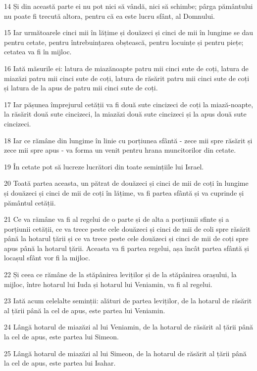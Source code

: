 \par 14 Și din această parte ei nu pot nici să vândă, nici să schimbe; pârga pământului nu poate fi trecută altora, pentru că ea este lucru sfânt, al Domnului.
\par 15 Iar următoarele cinci mii în lățime și douăzeci și cinci de mii în lungime se dau pentru cetate, pentru întrebuințarea obștească, pentru locuințe și pentru piețe; cetatea va fi în mijloc.
\par 16 Iată măsurile ei: latura de miazănoapte patru mii cinci sute de coți, latura de miazăzi patru mii cinci sute de coți, latura de răsărit patru mii cinci sute de coți și latura de la apus de patru mii cinci sute de coți.
\par 17 Iar pășunea împrejurul cetății va fi două sute cincizeci de coți la miază-noapte, la răsărit două sute cincizeci, la miazăzi două sute cincizeci și la apus două sute cincizeci.
\par 18 Iar ce rămâne din lungime în linie cu porțiunea sfântă - zece mii spre răsărit și zece mii spre apus - va forma un venit pentru hrana muncitorilor din cetate.
\par 19 În cetate pot să lucreze lucrători din toate semințiile lui Israel.
\par 20 Toată partea aceasta, un pătrat de douăzeci și cinci de mii de coți în lungime și douăzeci și cinci de mii de coți în lățime, va fi partea sfântă și va cuprinde și pământul cetății.
\par 21 Ce va rămâne va fi al regelui de o parte și de alta a porțiunii sfinte și a porțiunii cetății, ce va trece peste cele douăzeci și cinci de mii de coli spre răsărit până la hotarul țării și ce va trece peste cele douăzeci și cinci de mii de coți spre apus până la hotarul țării. Aceasta va fi partea regelui, așa încât partea sfântă și locașul sfânt vor fi la mijloc.
\par 22 Și ceea ce rămâne de la stăpânirea leviților și de la stăpânirea orașului, la mijloc, între hotarul lui Iuda și hotarul lui Veniamin, va fi al regelui.
\par 23 Iată acum celelalte seminții: alături de partea leviților, de la hotarul de răsărit al țării până la cel de apus, este partea lui Veniamin.
\par 24 Lângă hotarul de miazăzi al lui Veniamin, de la hotarul de răsărit al țării până la cel de apus, este partea lui Simeon.
\par 25 Lângă hotarul de miazăzi al lui Simeon, de la hotarul de răsărit al țării până la cel de apus, este partea lui Isahar.

